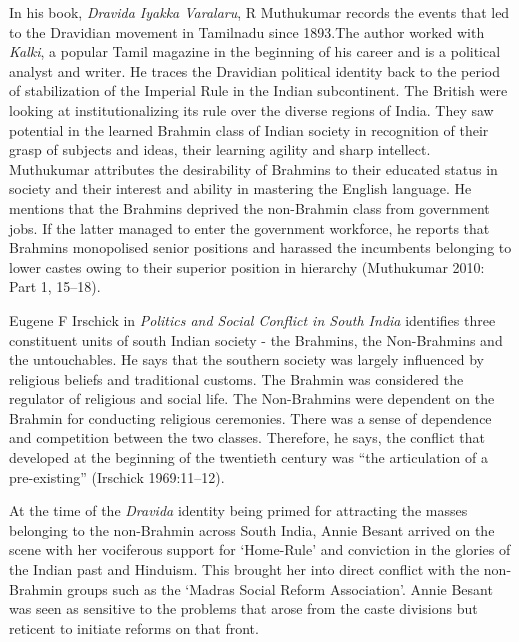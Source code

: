 In his book, \textit{Dravida Iyakka Varalaru}, R Muthukumar records the events that led to the Dravidian movement in Tamilnadu since 1893.The author worked with \textit{Kalki}, a popular Tamil magazine in the beginning of his career and is a political analyst and writer. He traces the Dravidian political identity back to the period of stabilization of the Imperial Rule in the Indian subcontinent. The British were looking at institutionalizing its rule over the diverse regions of India. They saw potential in the learned Brahmin class of Indian society in recognition of their grasp of subjects and ideas, their learning agility and sharp intellect. Muthukumar attributes the desirability of Brahmins to their educated status in society and their interest and ability in mastering the English language. He mentions that the Brahmins deprived the non-Brahmin class from government jobs. If the latter managed to enter the government workforce, he reports that Brahmins monopolised senior positions and harassed the incumbents belonging to lower castes owing to their superior position in hierarchy (Muthukumar 2010: Part 1, 15–18).

Eugene F Irschick in \textit{Politics and Social Conflict in South India} identifies three constituent units of south Indian society - the Brahmins, the Non-Brahmins and the untouchables. He says that the southern society was largely influenced by religious beliefs and traditional customs. The Brahmin was considered the regulator of religious and social life. The Non-Brahmins were dependent on the Brahmin for conducting religious ceremonies. There was a sense of dependence and competition between the two classes. Therefore, he says, the conflict that developed at the beginning of the twentieth century was “the articulation of a pre-existing” (Irschick 1969:11–12).

At the time of the \textit{Dravida} identity being primed for attracting the masses belonging to the non-Brahmin across South India, Annie Besant arrived on the scene with her vociferous support for ‘Home-Rule’ and conviction in the glories of the Indian past and Hinduism. This brought her into direct conflict with the non-Brahmin groups such as the ‘Madras Social Reform Association’. Annie Besant was seen as sensitive to the problems that arose from the caste divisions but reticent to initiate reforms on that front.

